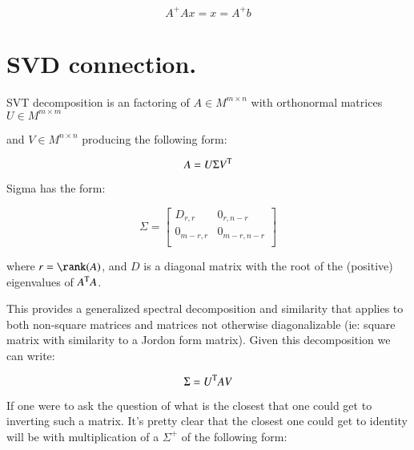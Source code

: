 \begin{equation}
A^{+} A x = x = A^{+} b
\end{equation}











































\section{SVD connection. }


SVT decomposition is an factoring of $A \in M^{m \times n}$ with orthonormal matrices $U \in M^{m \times m}$

and $V \in M^{n \times n} $ producing the following form:

\[
A = U \Sigma V^{\text{T}}
\]

Sigma has the form:

\[
\Sigma = 
\begin{bmatrix}
D_{r,r} & 0_{r,n-r} \\
0_{m-r,r} & 0_{m-r,n-r} \\
\end{bmatrix}
\]

where $r = \rank(A)$, and $D$ is a diagonal matrix with the root of the (positive) eigenvalues of $A^{\text{T}} A$.

This provides a generalized spectral decomposition and similarity that applies to both non-square matrices and matrices not otherwise diagonalizable
(ie: square matrix with similarity to a Jordon form matrix).  Given this decomposition we can write:

\[
\Sigma = U^{\text{T}} A V
\]

If one were to ask the question of what is the closest that one could get to inverting such a matrix.  It's pretty clear that the closest one could get to
identity will be with multiplication of a $\Sigma^{+}$ of the following form:

